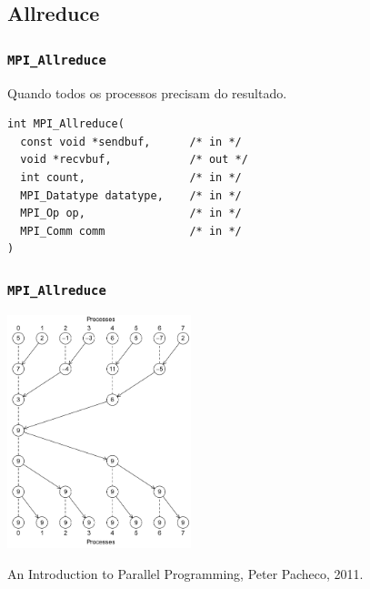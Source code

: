 \documentclass[xcolor={usenames,dvipsnames},12pt,presentation,aspectratio=169]{beamer}
\begin{document}
\subsection{Allreduce}
\begin{frame}[fragile]
  \frametitle{\texttt{MPI_Allreduce}}
  Quando todos os processos precisam do resultado.
\begin{center}
\begin{minipage}{0.95\textwidth}
  \begin{verbatim}
int MPI_Allreduce(
  const void *sendbuf,      /* in */
  void *recvbuf,            /* out */
  int count,                /* in */
  MPI_Datatype datatype,    /* in */
  MPI_Op op,                /* in */
  MPI_Comm comm             /* in */
)
  \end{verbatim}
\end{minipage}
\end{center}
\end{frame}
\begin{frame}
  \frametitle{\texttt{MPI_Allreduce}}
  \vspace{-3mm}
  \begin{center}
	\includegraphics[width=0.4\textwidth]{allreduce1.png}
  \end{center}
  \vspace{-4mm}
  {\tiny An Introduction to Parallel Programming, Peter Pacheco, 2011.}
\end{frame}
\end{document}
